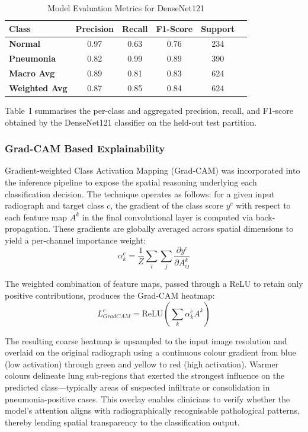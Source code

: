 \documentclass[conference]{IEEEtran}
\begin{document}
\begin{table}[h]
    \centering
    \caption{Model Evaluation Metrics for DenseNet121}
    \label{tab:model_comparison_pneumonia}
    \begin{tabular}{|l|c|c|c|c|c|}
    \hline
    \textbf{Class} & \textbf{Precision} & \textbf{Recall} & \textbf{F1-Score} & \textbf{Support} \\
    \hline
    \textbf{Normal} & 0.97 & 0.63 & 0.76 & 234 \\
    \hline
    \textbf{Pneumonia} & 0.82 & 0.99 & 0.89 & 390 \\
    \hline
    \textbf{Macro Avg} & 0.89 & 0.81 & 0.83 & 624 \\
    \hline
    \textbf{Weighted Avg} & 0.87 & 0.85 & 0.84 & 624 \\
    \hline
    \end{tabular}
\end{table}

Table~I summarises the per-class and aggregated precision, recall, and F1-score obtained by the DenseNet121 classifier on the held-out test partition.

\subsubsection{Grad-CAM Based Explainability}

Gradient-weighted Class Activation Mapping (Grad-CAM) was incorporated into the inference pipeline to expose the spatial reasoning underlying each classification decision. The technique operates as follows: for a given input radiograph and target class $c$, the gradient of the class score $y^c$ with respect to each feature map $A^k$ in the final convolutional layer is computed via back-propagation. These gradients are globally averaged across spatial dimensions to yield a per-channel importance weight:
\begin{equation}
\alpha_k^c = \frac{1}{Z} \sum_{i}\sum_{j} \frac{\partial y^c}{\partial A_{ij}^k}
\end{equation}

The weighted combination of feature maps, passed through a ReLU to retain only positive contributions, produces the Grad-CAM heatmap:
\begin{equation}
L_{GradCAM}^c = \text{ReLU}\left(\sum_k \alpha_k^c A^k\right)
\end{equation}

The resulting coarse heatmap is upsampled to the input image resolution and overlaid on the original radiograph using a continuous colour gradient from blue (low activation) through green and yellow to red (high activation). Warmer colours delineate lung sub-regions that exerted the strongest influence on the predicted class---typically areas of suspected infiltrate or consolidation in pneumonia-positive cases. This overlay enables clinicians to verify whether the model's attention aligns with radiographically recognisable pathological patterns, thereby lending spatial transparency to the classification output.
\end{document}
